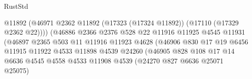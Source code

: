\begin{lexlean}{RustStd}
\begin{coremodule}
                                                @11892
                                                (@46971
                                                  @2362
                                                  @11892
                                                  (@17323 (@17324 @11892))
                                                  (@17110 (@17329 @2362 @22))))
                                              (@46886
                                                @2366
                                                @2376
                                                @528
                                                @22
                                                @11916
                                                @11925
                                                @4545
                                                @11931
                                                (@46897
                                                  @2365
                                                  @503
                                                  @11
                                                  @11916
                                                  @11923
                                                  @4628
                                                  (@46906
                                                    @830
                                                    @17
                                                    @19
                                                    @6456
                                                    @11915
                                                    @11922
                                                    @4533
                                                    @11898
                                                    @4539
                                                    @24260
                                                    (@46905
                                                      @828
                                                      @108
                                                      @17
                                                      @14
                                                      @6636
                                                      @4545
                                                      @4558
                                                      @4533
                                                      @11908
                                                      @4539
                                                      (@24270 @827 @6636 @25071 @25075)

\end{coremodule}
\end{lexlean}
